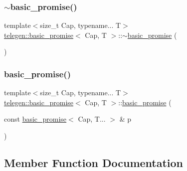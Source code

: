 \mbox{\label{classtelegen_1_1basic__promise_afc06bee6b9672fce7cdbe0a29571223a}} 
\subsubsection{\texorpdfstring{$\sim$basic\+\_\+promise()}{~basic\_promise()}}
{\footnotesize\ttfamily template$<$size\+\_\+t Cap, typename... T$>$ \\
\hyperlink{classtelegen_1_1basic__promise}{telegen\+::basic\+\_\+promise}$<$ Cap, T $>$\+::$\sim$\hyperlink{classtelegen_1_1basic__promise}{basic\+\_\+promise} (\begin{DoxyParamCaption}{ }\end{DoxyParamCaption})\hspace{0.3cm}{\ttfamily [inline]}}

\mbox{\label{classtelegen_1_1basic__promise_ad0b847d836f2cb8f15c4434b611c260f}} 
\subsubsection{\texorpdfstring{basic\+\_\+promise()}{basic\_promise()}\hspace{0.1cm}{\footnotesize\ttfamily [5/5]}}
{\footnotesize\ttfamily template$<$size\+\_\+t Cap, typename... T$>$ \\
\hyperlink{classtelegen_1_1basic__promise}{telegen\+::basic\+\_\+promise}$<$ Cap, T $>$\+::\hyperlink{classtelegen_1_1basic__promise}{basic\+\_\+promise} (\begin{DoxyParamCaption}\item[{const \hyperlink{classtelegen_1_1basic__promise}{basic\+\_\+promise}$<$ Cap, T... $>$ \&}]{p }\end{DoxyParamCaption})\hspace{0.3cm}{\ttfamily [delete]}}



\subsection{Member Function Documentation}
\mbox{\label{classtelegen_1_1basic__promise_a520a6133513aaa9c7d099c038b5ea8b7}} 
